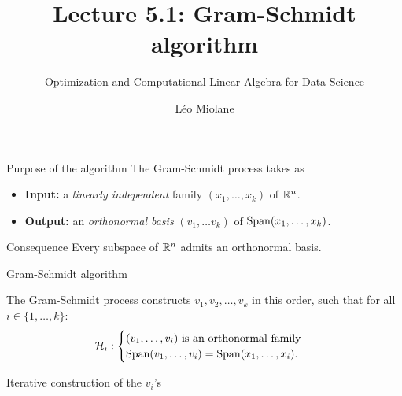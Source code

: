 \documentclass{beamer}
\title{Lecture 5.1: Gram-Schmidt algorithm}
\subtitle{Optimization and Computational Linear Algebra for Data Science}
\author{Léo Miolane}
\date{}
\begin{document}
\setcounter{showProgressBar}{0}
\setcounter{showSlideNumbers}{0}

\frame{\titlepage}
\setcounter{framenumber}{0}
\setcounter{showSlideNumbers}{1}

\begin{frame}[t]{Purpose of the algorithm}
	The Gram-Schmidt process takes as 
	\begin{itemize}
		\item \textbf{Input:} a \emph{linearly independent} family $(x_1, \dots, x_k)$ of $\mathbb{R}^n$.
		\item \textbf{Output:} an \emph{orthonormal basis} $(v_1, \dots v_k)$ of ${{\rm Span}}(x_1, \dots, x_k)$.
	\end{itemize}
	\vspace{4cm}

	\begin{block}{Consequence}
		Every subspace of $\mathbb{R}^n$ admits an orthonormal basis.
	\end{block}

\end{frame}

\begin{frame}[t]{Gram-Schmidt algorithm}
	\grid

	The Gram-Schmidt process constructs $v_1,v_2, \dots, v_k$ in this order, such that for all $i \in \{1, \dots, k\}$:
	\begin{align*}
		\mathcal{H}_i: 
		\begin{cases}
			(v_1, \dots, v_i) \ \text{is an orthonormal family} \\
			{{\rm Span}}(v_1, \dots, v_i) = {{\rm Span}}(x_1, \dots, x_i).
		\end{cases}
	\end{align*}
\end{frame}

\begin{frame}[t]{Iterative construction of the $v_i$'s}
	\grid

	\pause
	\pause
\end{frame}
\end{document}
